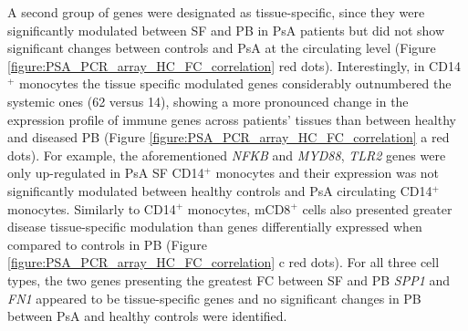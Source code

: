 A second group of genes were designated as tissue-specific, since they were significantly modulated between SF and PB in PsA patients but did not show significant changes between controls and PsA at the circulating level (Figure \ref{figure:PSA_PCR_array_HC_FC_correlation} red dots). Interestingly, in CD14$^+$ monocytes the tissue specific modulated genes considerably outnumbered the systemic ones (62 versus 14), showing a more pronounced change in the expression profile of immune genes across patients' tissues than between healthy and diseased PB (Figure \ref{figure:PSA_PCR_array_HC_FC_correlation} a red dots). For example, the aforementioned \textit{NFKB} and \textit{MYD88}, \textit{TLR2} genes were only up-regulated in PsA SF CD14$^+$ monocytes and their expression was not significantly modulated between healthy controls and PsA circulating CD14$^+$ monocytes.  Similarly to CD14$^+$ monocytes, mCD8$^+$ cells also presented greater disease tissue-specific modulation than genes differentially expressed when compared to controls in PB (Figure \ref{figure:PSA_PCR_array_HC_FC_correlation} c red dots). For all three cell types, the two genes presenting the greatest FC between SF and PB \textit{SPP1} and \textit{FN1} appeared to be tissue-specific genes and no significant changes in PB between PsA and healthy controls were identified.

